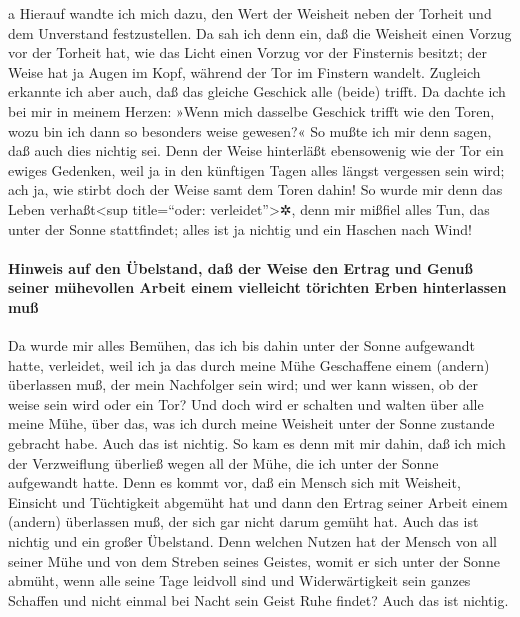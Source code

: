 a Hierauf wandte ich mich dazu, den Wert der Weisheit neben der Torheit
und dem Unverstand festzustellen. Da sah ich denn ein,
daß die Weisheit einen Vorzug vor der Torheit hat, wie das Licht einen
Vorzug vor der Finsternis besitzt; der Weise hat ja Augen
im Kopf, während der Tor im Finstern wandelt. Zugleich erkannte ich aber
auch, daß das gleiche Geschick alle (beide) trifft. Da
dachte ich bei mir in meinem Herzen: »Wenn mich dasselbe Geschick trifft
wie den Toren, wozu bin ich dann so besonders weise gewesen?« So mußte
ich mir denn sagen, daß auch dies nichtig sei. Denn der
Weise hinterläßt ebensowenig wie der Tor ein ewiges Gedenken, weil ja in
den künftigen Tagen alles längst vergessen sein wird; ach ja, wie stirbt
doch der Weise samt dem Toren dahin! So wurde mir denn
das Leben verhaßt\textless sup title=``oder: verleidet''\textgreater✲,
denn mir mißfiel alles Tun, das unter der Sonne stattfindet; alles ist
ja nichtig und ein Haschen nach Wind!

\hypertarget{hinweis-auf-den-uxfcbelstand-dauxdf-der-weise-den-ertrag-und-genuuxdf-seiner-muxfchevollen-arbeit-einem-vielleicht-tuxf6richten-erben-hinterlassen-muuxdf}{%
\paragraph{Hinweis auf den Übelstand, daß der Weise den Ertrag und Genuß
seiner mühevollen Arbeit einem vielleicht törichten Erben hinterlassen
muß}\label{hinweis-auf-den-uxfcbelstand-dauxdf-der-weise-den-ertrag-und-genuuxdf-seiner-muxfchevollen-arbeit-einem-vielleicht-tuxf6richten-erben-hinterlassen-muuxdf}}

Da wurde mir alles Bemühen, das ich bis dahin unter der
Sonne aufgewandt hatte, verleidet, weil ich ja das durch meine Mühe
Geschaffene einem (andern) überlassen muß, der mein Nachfolger sein
wird; und wer kann wissen, ob der weise sein wird oder
ein Tor? Und doch wird er schalten und walten über alle meine Mühe, über
das, was ich durch meine Weisheit unter der Sonne zustande gebracht
habe. Auch das ist nichtig. So kam es denn mit mir dahin,
daß ich mich der Verzweiflung überließ wegen all der Mühe, die ich unter
der Sonne aufgewandt hatte. Denn es kommt vor, daß ein
Mensch sich mit Weisheit, Einsicht und Tüchtigkeit abgemüht hat und dann
den Ertrag seiner Arbeit einem (andern) überlassen muß, der sich gar
nicht darum gemüht hat. Auch das ist nichtig und ein großer Übelstand.
Denn welchen Nutzen hat der Mensch von all seiner Mühe
und von dem Streben seines Geistes, womit er sich unter der Sonne
abmüht, wenn alle seine Tage leidvoll sind und
Widerwärtigkeit sein ganzes Schaffen und nicht einmal bei Nacht sein
Geist Ruhe findet? Auch das ist nichtig.

